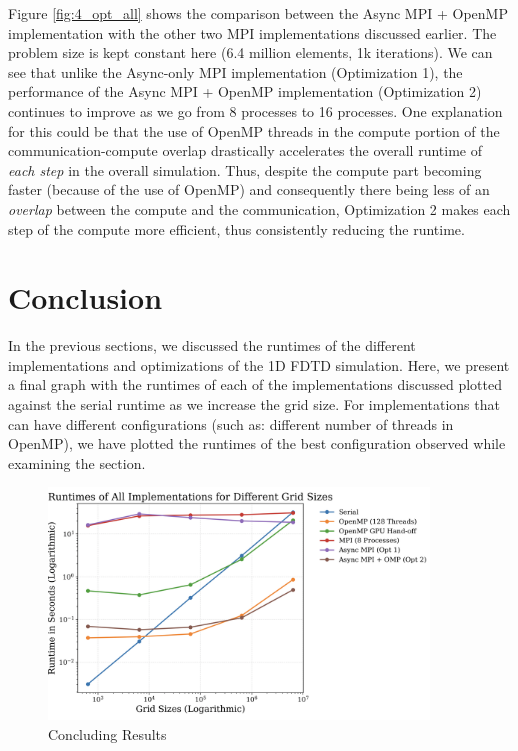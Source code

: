 \documentclass[a4paper,10pt]{article}
\begin{document}
Figure \ref{fig:4_opt_all} shows the comparison between the Async MPI + OpenMP implementation with the other two MPI implementations discussed earlier. The problem size is kept constant here (6.4 million elements, 1k iterations). We can see that unlike the Async-only MPI implementation (Optimization 1), the performance of the Async MPI + OpenMP implementation (Optimization 2) continues to improve as we go from 8 processes to 16 processes. One explanation for this could be that the use of OpenMP threads in the compute portion of the communication-compute overlap drastically accelerates the overall runtime of \textit{each step} in the overall simulation. Thus, despite the compute part becoming faster (because of the use of OpenMP) and consequently there being less of an \textit{overlap} between the compute and the communication, Optimization 2 makes each step of the compute more efficient, thus consistently reducing the runtime.

\section{Conclusion}
In the previous sections, we discussed the runtimes of the different implementations and optimizations of the 1D FDTD simulation. Here, we present a final graph with the runtimes of each of the implementations discussed plotted against the serial runtime as we increase the grid size. For implementations that can have different configurations (such as: different number of threads in OpenMP), we have plotted the runtimes of the best configuration observed while examining the section. 

\begin{figure}[H]
  \centering
  \includegraphics[width=0.9\textwidth]{../images/final_everything_plot.png}
  \caption{Concluding Results}
   \label{fig:conclusion}
\end{figure}
\end{document}
